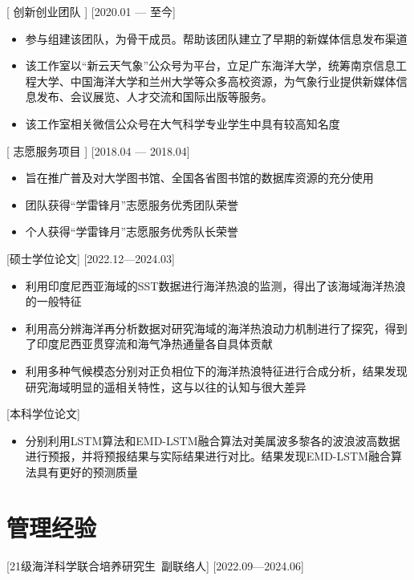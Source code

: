 \documentclass{resume}
\begin{document}
[ 创新创业团队 ]
[2020.01 — 至今]
\begin{itemize}
 \item 参与组建该团队，为骨干成员。帮助该团队建立了早期的新媒体信息发布渠道
  \item 该工作室以“新云天气象”公众号为平台，立足广东海洋大学，统筹南京信息工程大学、中国海洋大学和兰州大学等众多高校资源，为气象行业提供新媒体信息发布、会议展览、人才交流和国际出版等服务。
  \item 该工作室相关微信公众号在大气科学专业学生中具有较高知名度
\end{itemize}


[ 志愿服务项目 ]
[2018.04 — 2018.04]
\begin{itemize}
  \item 旨在推广普及对大学图书馆、全国各省图书馆的数据库资源的充分使用
  \item 团队获得“学雷锋月”志愿服务优秀团队荣誉
  \item 个人获得“学雷锋月”志愿服务优秀队长荣誉
\end{itemize}

[硕士学位论文]
[2022.12—2024.03] 

\begin{itemize}
  \item 利用印度尼西亚海域的SST数据进行海洋热浪的监测，得出了该海域海洋热浪的一般特征
  \item 利用高分辨海洋再分析数据对研究海域的海洋热浪动力机制进行了探究，得到了印度尼西亚贯穿流和海气净热通量各自具体贡献
\item 利用多种气候模态分别对正负相位下的海洋热浪特征进行合成分析，结果发现研究海域明显的遥相关特性，这与以往的认知与很大差异
\end{itemize}

[本科学位论文]

\begin{itemize}
  \item 分别利用LSTM算法和EMD-LSTM融合算法对美属波多黎各的波浪波高数据进行预报，并将预报结果与实际结果进行对比。结果发现EMD-LSTM融合算法具有更好的预测质量
\end{itemize}

\section[管理经验]{管理经验}
[21级海洋科学联合培养研究生\ 副联络人]
[2022.09—2024.06] 
\end{document}
